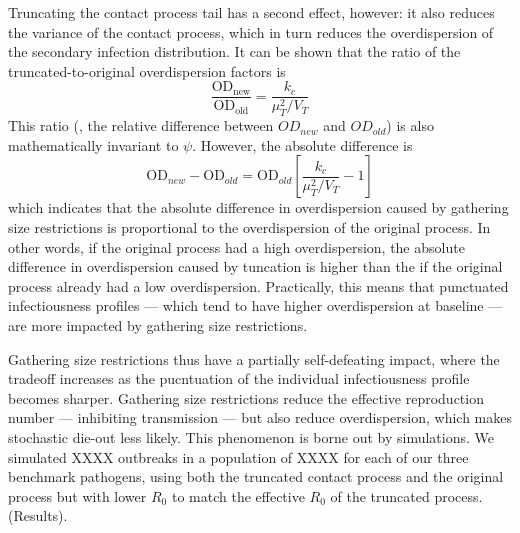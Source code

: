 Truncating the contact process tail has a second effect, however: it also reduces the variance of the contact process, which in turn reduces the overdispersion of the secondary infection distribution. It can be shown that the ratio of the truncated-to-original overdispersion factors is 
\begin{equation}
	\frac{\text{OD}_{\text{new}}}{\text{OD}_{\text{old}}} = \frac{k_c}{\mu_T^2/V_T}
\end{equation}
This ratio (\ie, the relative difference between $OD_{new}$ and $OD_{old}$) is also mathematically invariant to $\psi$. However, the absolute difference is 
\begin{equation}
	\text{OD}_{new} - \text{OD}_{old} = \text{OD}_{old} [\frac{k_c}{\mu_T^2/V_T} - 1]
\end{equation}
which indicates that the absolute difference in overdispersion caused by gathering size restrictions is proportional to the overdispersion of the original process. In other words, if the original process had a high overdispersion, the absolute difference in overdispersion caused by tuncation is higher than the if the original process already had a low overdispersion. Practically, this means that punctuated infectiousness profiles --- which tend to have higher overdispersion at baseline --- are more impacted by gathering size restrictions. 

Gathering size restrictions thus have a partially self-defeating impact, where the tradeoff increases as the pucntuation of the individual infectiousness profile becomes sharper. Gathering size restrictions reduce the effective reproduction number  --- inhibiting transmission --- but also reduce overdispersion, which makes stochastic die-out less likely. This phenomenon is borne out by simulations. We simulated XXXX outbreaks in a population of XXXX for each of our three benchmark pathogens, using both the truncated contact process and the original process but with lower $R_0$ to match the effective $R_0$ of the truncated process. (Results). 


